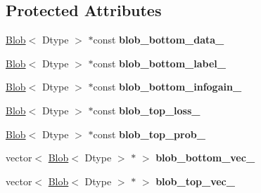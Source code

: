 \subsection*{Protected Attributes}
\begin{DoxyCompactItemize}
\item 
\mbox{\label{classcaffe_1_1_infogain_loss_layer_test_abbf5d3eefef23100291e800bb9105265}} 
\mbox{\hyperlink{classcaffe_1_1_blob}{Blob}}$<$ Dtype $>$ $\ast$const {\bfseries blob\+\_\+bottom\+\_\+data\+\_\+}
\item 
\mbox{\label{classcaffe_1_1_infogain_loss_layer_test_abc4f2fa7f9be8d7e6f2e4081273a1478}} 
\mbox{\hyperlink{classcaffe_1_1_blob}{Blob}}$<$ Dtype $>$ $\ast$const {\bfseries blob\+\_\+bottom\+\_\+label\+\_\+}
\item 
\mbox{\label{classcaffe_1_1_infogain_loss_layer_test_a9ce20a5036ffdcee352289b999a62819}} 
\mbox{\hyperlink{classcaffe_1_1_blob}{Blob}}$<$ Dtype $>$ $\ast$const {\bfseries blob\+\_\+bottom\+\_\+infogain\+\_\+}
\item 
\mbox{\label{classcaffe_1_1_infogain_loss_layer_test_a0a9d2dd0ee181f6e34aa66cde731b288}} 
\mbox{\hyperlink{classcaffe_1_1_blob}{Blob}}$<$ Dtype $>$ $\ast$const {\bfseries blob\+\_\+top\+\_\+loss\+\_\+}
\item 
\mbox{\label{classcaffe_1_1_infogain_loss_layer_test_a9e8092547e491ff6103021c84ef5f833}} 
\mbox{\hyperlink{classcaffe_1_1_blob}{Blob}}$<$ Dtype $>$ $\ast$const {\bfseries blob\+\_\+top\+\_\+prob\+\_\+}
\item 
\mbox{\label{classcaffe_1_1_infogain_loss_layer_test_aa9924d7abaa6850253e23ec07e059eb9}} 
vector$<$ \mbox{\hyperlink{classcaffe_1_1_blob}{Blob}}$<$ Dtype $>$ $\ast$ $>$ {\bfseries blob\+\_\+bottom\+\_\+vec\+\_\+}
\item 
\mbox{\label{classcaffe_1_1_infogain_loss_layer_test_ad94ba0381568266b5df85ae6ba45f537}} 
vector$<$ \mbox{\hyperlink{classcaffe_1_1_blob}{Blob}}$<$ Dtype $>$ $\ast$ $>$ {\bfseries blob\+\_\+top\+\_\+vec\+\_\+}

\end{DoxyCompactItemize}
